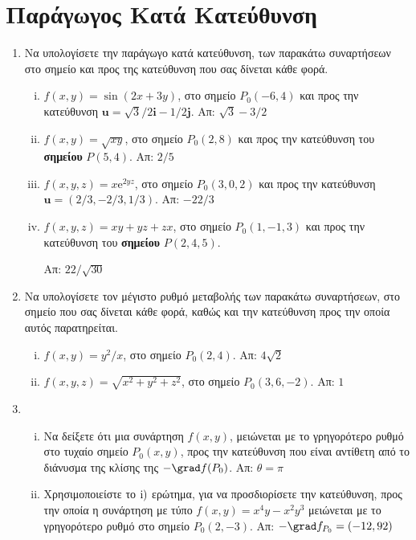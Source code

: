 \section*{Παράγωγος Κατά Κατεύθυνση}

\begin{enumerate}
  \item Να υπολογίσετε την παράγωγο κατά κατεύθυνση, των παρακάτω συναρτήσεων στο σημείο 
    και προς της κατεύθυνση που σας δίνεται κάθε φορά.
    \begin{enumerate}[i)]
      \item $ f(x,y) = \sin{(2x+3y)} $, στο σημείο $ P_{0}(-6,4) $ και προς την
        κατεύθυνση  $ \mathbf{u} = \sqrt{3} /2 \mathbf{i} - 1/2 \mathbf{j}$. 
        \hfill Απ: $ \sqrt{3} - 3/2 $ 
      \item $ f(x,y) = \sqrt{xy} $, στο σημείο $ P_{0}(2,8) $ και προς την
        κατεύθυνση του \textbf{σημείου} $P(5,4) $. \hfill Απ: $ 2 / 5 $ 
      \item $ f(x,y,z) = x \mathrm{e}^{2yz} $, στο σημείο $ P_{0}(3,0,2) $ και προς την
        κατεύθυνση  $ \mathbf{u} = (2/3, -2/3 , 1/3) $. 
        \hfill Απ: $-22/3$ 
      \item $ f(x,y,z) = xy+yz+zx $, στο σημείο $ P_{0}(1,-1,3) $ και προς την
        κατεύθυνση  του \textbf{σημείου} $P(2,4,5)$. 

        \hfill Απ: $ 22/\sqrt{30} $
    \end{enumerate}

  \item Να υπολογίσετε τον μέγιστο ρυθμό μεταβολής των παρακάτω συναρτήσεων, στο σημείο 
    που σας δίνεται κάθε φορά, καθώς και την κατεύθυνση προς την οποία αυτός 
    παρατηρείται.
    \begin{enumerate}[i)]
      \item $ f(x,y) = y^{2}/x $, στο σημείο $ P_{0}(2,4) $.
        \hfill Απ: $4 \sqrt{2}$ 
      \item $ f(x,y,z) = \sqrt{x^{2}+y^{2}+z^{2}} $, στο σημείο $ P_{0}(3,6,-2) $.
        \hfill Απ: $ 1 $
    \end{enumerate}

  \item 
    \begin{enumerate}[i)]
      \item Να δείξετε ότι μια συνάρτηση $ f(x,y) $, μειώνεται με το γρηγορότερο ρυθμό
        στο τυχαίο σημείο $ P_{0}(x,y) $, προς την κατεύθυνση που είναι αντίθετη από το 
        διάνυσμα της κλίσης της $ - \grad f(P_{0}) $.
        \hfill Απ: $ \theta = \pi $  
      \item Χρησιμοποιείστε το $ \rm{i)} $ ερώτημα, για να προσδιορίσετε την κατεύθυνση,
        προς την οποία η συνάρτηση με τύπο $ f(x,y) = x^{4}y-x^{2}y^{3} $ μειώνεται με 
        το γρηγορότερο ρυθμό στο σημείο $ P_{0}(2,-3) $. 
        \hfill Απ: $ - \grad f_{P_{0}} = (-12,92) $
    \end{enumerate}


\end{enumerate}
